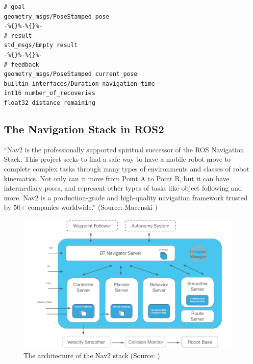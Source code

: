 \begin{lstlisting}
# goal
geometry_msgs/PoseStamped pose
-%{}%-%{}%-
# result
std_msgs/Empty result
-%{}%-%{}%-
# feedback
geometry_msgs/PoseStamped current_pose
builtin_interfaces/Duration navigation_time
int16 number_of_recoveries
float32 distance_remaining
\end{lstlisting}
    
\subsection{The Navigation Stack in ROS2}
\label{sec:navigation_stack}

\begin{displayquote}
    \enquote{Nav2 is the professionally supported spiritual successor of the ROS Navigation Stack. This project seeks to find a safe way to have a mobile robot move to complete complex tasks through many types of environments and classes of robot kinematics. Not only can it move from Point A to Point B, but it can have intermediary poses, and represent other types of tasks like object following and more. Nav2 is a production-grade and high-quality navigation framework trusted by 50+ companies worldwide.} (Source: Macenski \cite{steve_macenski_navigation_2020})
\end{displayquote}

\begin{figure}[!b]
    \centering \captionsetup{justification=centering}
    \includegraphics[width=\textwidth]{figures/20_state_of_the_art/nav2_architecture.png}
    \caption[The architecture of the Nav2 stack]{The architecture of the Nav2 stack (Source: \cite{steve_macenski_navigation_2020})}
    \label{fig:nav2_architecture}
\end{figure}

